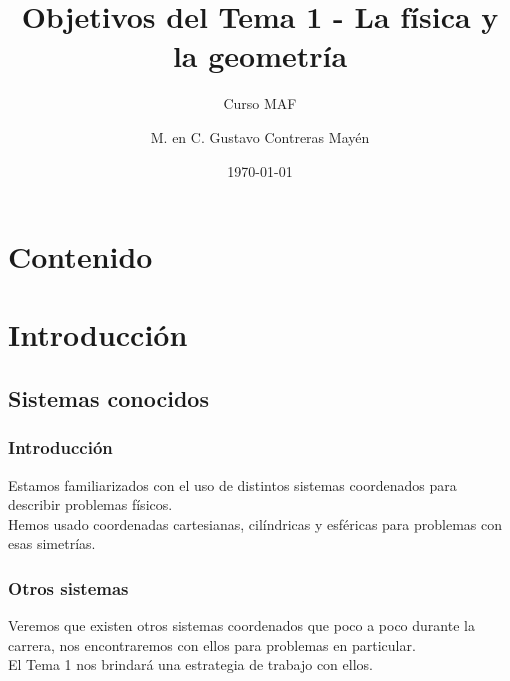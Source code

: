 
\title{\large{Objetivos del Tema 1 - La física y la geometría}}
\subtitle{Curso MAF}
\author{M. en C. Gustavo Contreras Mayén}
\date{\today}

\maketitle
\fontsize{14}{14}\selectfont
{}
\section*{Contenido}
\section{Introducción}
\subsection{Sistemas conocidos}
\begin{frame}
\frametitle{Introducción}
Estamos familiarizados con el uso de distintos sistemas coordenados para describir problemas físicos.
\\
\bigskip
Hemos usado coordenadas cartesianas, cilíndricas y esféricas para problemas con esas simetrías.
\end{frame}
\begin{frame}
\frametitle{Otros sistemas}
Veremos que existen otros sistemas coordenados que poco a poco durante la carrera, nos encontraremos con ellos para problemas en particular.
\\
\bigskip
\pause
El Tema 1 nos brindará una estrategia de trabajo con ellos.
\end{frame}
